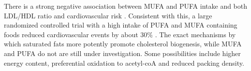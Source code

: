 \documentclass{tufte-handout}
\begin{document}
There is a strong negative association between MUFA and PUFA intake and both LDL/HDL ratio and cardiovascular risk \citep{Hu1998,Zong2016}.  Consistent with this, a large randomized controlled trial with a high intake of PUFA and MUFA containing foods reduced cardiovascular events by about 30\% \citep{Estruch2013a}.  The exact mechanisms by which saturated fats more potently promote cholesterol biogenesis, while MUFA and PUFA do not are still under investigation.  Some possibilities include higher energy content, preferential oxidation to acetyl-coA and reduced packing density.




\end{document}
